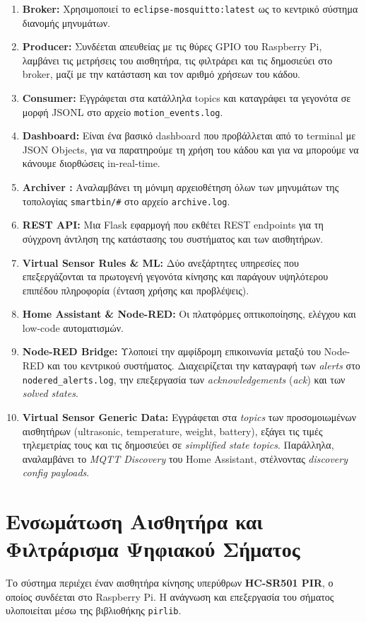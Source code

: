 \documentclass[acmsmall,screen,nonacm]{acmart}
\begin{document}
	\begin{enumerate}
		\item \textbf{Broker:} Χρησιμοποιεί το \texttt{eclipse-mosquitto:latest} ως το κεντρικό  σύστημα διανομής μηνυμάτων.
		\item \textbf{Producer:} Συνδέεται απευθείας με τις θύρες GPIO του Raspberry Pi, λαμβάνει τις μετρήσεις του αισθητήρα, τις φιλτράρει και τις δημοσιεύει στο broker, μαζί με την κατάσταση και τον αριθμό χρήσεων του κάδου.
		\item \textbf{Consumer:} Εγγράφεται στα κατάλληλα topics και καταγράφει τα γεγονότα σε μορφή JSONL στο αρχείο \texttt{motion\_events.log}.
		\item \textbf{Dashboard:} Είναι ένα βασικό dashboard που προβάλλεται από το terminal με JSON Objects, για να παρατηρούμε τη χρήση του κάδου και για να μπορούμε να κάνουμε διορθώσεις in-real-time.
		\item \textbf{Archiver :} Αναλαμβάνει τη μόνιμη αρχειοθέτηση όλων των μηνυμάτων της τοπολογίας \texttt{smartbin/\#} στο αρχείο \texttt{archive.log}.
		\item \textbf{REST API:} Μια Flask εφαρμογή που εκθέτει REST endpoints για τη σύγχρονη άντληση της κατάστασης του συστήματος και των αισθητήρων.
		\item \textbf{Virtual Sensor Rules \& ML:} Δύο ανεξάρτητες υπηρεσίες που επεξεργάζονται τα πρωτογενή γεγονότα κίνησης και παράγουν υψηλότερου επιπέδου πληροφορία (ένταση χρήσης και προβλέψεις).
		\item \textbf{Home Assistant \& Node-RED:} Οι πλατφόρμες οπτικοποίησης, ελέγχου και low-code αυτοματισμών.
		\item \textbf{Node-RED Bridge:} Υλοποιεί την αμφίδρομη επικοινωνία μεταξύ του Node-RED και του κεντρικού συστήματος. Διαχειρίζεται την καταγραφή των \emph{alerts} στο \texttt{nodered\_alerts.log}, την επεξεργασία των \emph{acknowledgements} (\emph{ack}) και των \emph{solved states}.
		\item \textbf{Virtual Sensor Generic Data:} Εγγράφεται στα \emph{topics} των προσομοιωμένων αισθητήρων (ultrasonic, temperature, weight, battery), εξάγει τις τιμές τηλεμετρίας τους και τις δημοσιεύει σε \emph{simplified state topics}. Παράλληλα, αναλαμβάνει το \emph{MQTT Discovery} του Home Assistant, στέλνοντας \emph{discovery config payloads}.
	\end{enumerate}
	
	\section{Ενσωμάτωση Αισθητήρα και Φιλτράρισμα Ψηφιακού Σήματος}
	Το σύστημα περιέχει έναν αισθητήρα κίνησης υπερύθρων \textbf{HC-SR501 PIR}, ο οποίος συνδέεται στο Raspberry Pi. Η ανάγνωση και επεξεργασία του σήματος υλοποιείται μέσω της βιβλιοθήκης \texttt{pirlib}.
	
\end{document}
